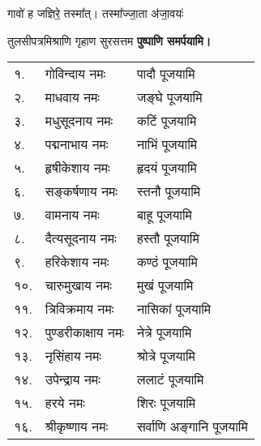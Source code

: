 \begin{center}
{गावो॑ ह जज्ञिरे॒ तस्मा᳚त्। तस्मा᳚ज्जा॒ता अ॑जा॒वयः॑}

{तुलसीपत्रमिश्राणि गृहाण सुरसत्तम}
\textbf{\devAya{} पुष्पाणि समर्पयामि।}


\begin{longtable}{ll@{—}l}
१. & गोविन्दाय नमः & पादौ पूजयामि \\
२. & माधवाय नमः &  जङ्घे पूजयामि \\
३. & मधुसूदनाय नमः & कटिं पूजयामि \\
४. & पद्मनाभाय नमः & नाभिं पूजयामि \\
५. & हृषीकेशाय नमः & हृदयं पूजयामि \\
६. & सङ्कर्षणाय नमः & स्तनौ पूजयामि \\
७. & वामनाय नमः & बाहू पूजयामि \\
८. & दैत्यसूदनाय नमः & हस्तौ पूजयामि \\
९. & हरिकेशाय नमः & कण्ठं पूजयामि \\
१०. & चारुमुखाय नमः & मुखं पूजयामि \\
११. & त्रिविक्रमाय नमः & नासिकां पूजयामि \\
१२. & पुण्डरीकाक्षाय नमः & नेत्रे पूजयामि \\
१३. & नृसिंहाय नमः & श्रोत्रे पूजयामि \\
१४. & उपेन्द्राय नमः & ललाटं पूजयामि \\
१५. & हरये नमः & शिरः पूजयामि \\
१६. & श्रीकृष्णाय नमः & सर्वाणि अङ्गानि पूजयामि \\
\end{longtable}


\end{center}
